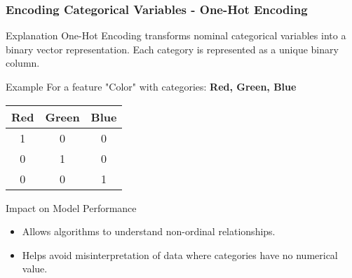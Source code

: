 \documentclass{beamer}
\begin{document}
\begin{frame}[fragile]
    \frametitle{Encoding Categorical Variables - One-Hot Encoding}
    \begin{block}{Explanation}
        One-Hot Encoding transforms nominal categorical variables into a binary vector representation. Each category is represented as a unique binary column.
    \end{block}
    \begin{block}{Example}
        For a feature "Color" with categories: \textbf{Red, Green, Blue}
        \begin{table}[]
            \centering
            \begin{tabular}{|c|c|c|}
                \hline
                \textbf{Red} & \textbf{Green} & \textbf{Blue} \\ \hline
                1 & 0 & 0 \\ \hline
                0 & 1 & 0 \\ \hline
                0 & 0 & 1 \\ \hline
            \end{tabular}
        \end{table}
    \end{block}
    \begin{block}{Impact on Model Performance}
        \begin{itemize}
            \item Allows algorithms to understand non-ordinal relationships.
            \item Helps avoid misinterpretation of data where categories have no numerical value.
        \end{itemize}
    \end{block}
\end{frame}
\end{document}
